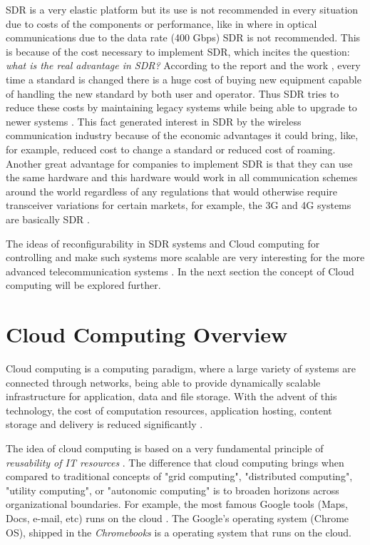SDR is a very elastic platform but its use is not recommended in every situation
due to costs of the components or performance, like in \cite{ilan2015} where in
optical communications due to the data rate (400 Gbps) SDR is not recommended.
This is because of the cost necessary to implement SDR, which incites the
question: \emph{what is the real advantage in SDR?} According to the report
\cite{introlte} and the work \cite{alan2008}, every time a standard is changed
there is a huge cost of buying new equipment capable of handling the new
standard by both user and operator. Thus SDR tries to reduce these costs by
maintaining legacy systems while being able to upgrade to newer systems
\cite{dayananda2012}. This fact generated interest in SDR \cite{alan2008}
\cite{dayananda2012} by the wireless communication industry because of the
economic advantages it could bring, like, for example, reduced cost to change a
standard or reduced cost of roaming. Another great advantage for companies to
implement SDR is that they can use the same hardware and this hardware would
work in all communication schemes around the world regardless of any regulations
that would otherwise require transceiver variations for certain markets, for
example, the 3G and 4G systems are basically SDR \cite{octasicbts}.

The ideas of reconfigurability in SDR systems and Cloud computing for
controlling and make such systems more scalable are very interesting for the
more advanced telecommunication systems \cite{dayananda2012}. In the next
section the concept of Cloud computing will be explored further.

\section{Cloud Computing Overview}
\label{sec:sdr_cloud}

Cloud computing is a computing paradigm, where a large variety of systems are
connected through networks, being able to provide dynamically scalable
infrastructure for application, data and file storage. With the advent of this
technology, the cost of computation resources, application hosting, content
storage and delivery is reduced significantly \cite{dayananda2012}.

The idea of cloud computing is based on a very fundamental principle of
\emph{reusability of IT resources} \cite{dayananda2012}. The difference that
cloud computing brings when compared to traditional concepts of "grid
computing", "distributed computing", "utility computing", or "autonomic
computing" is to broaden horizons across organizational boundaries. For example,
the most famous Google tools (Maps, Docs, e-mail, etc) runs on the cloud
\cite{web:googledocs}. The Google's operating system (Chrome OS), shipped in the
\textit{Chromebooks} \cite{web:googlechromebook} is a operating system that runs
on the cloud.

